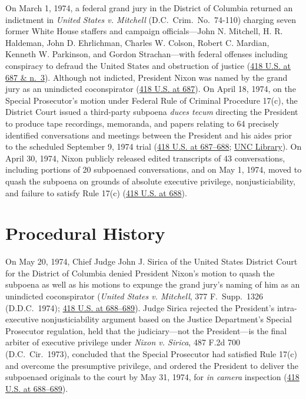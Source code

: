 \documentclass[12pt]{article}
\begin{document}
On March 1, 1974, a federal grand jury in the District of Columbia returned an indictment in \textit{United States v. Mitchell} (D.C.\ Crim.\ No.\ 74-110) charging seven former White House staffers and campaign officials---John N. Mitchell, H. R. Haldeman, John D. Ehrlichman, Charles W. Colson, Robert C. Mardian, Kenneth W. Parkinson, and Gordon Strachan---with federal offenses including conspiracy to defraud the United States and obstruction of justice (\href{https://supreme.justia.com/cases/federal/us/418/683/}{418 U.S. at 687 \& n.\ 3}). Although not indicted, President Nixon was named by the grand jury as an unindicted coconspirator (\href{https://supreme.justia.com/cases/federal/us/418/683/}{418 U.S. at 687}). On April 18, 1974, on the Special Prosecutor's motion under Federal Rule of Criminal Procedure 17(c), the District Court issued a third-party subpoena \textit{duces tecum} directing the President to produce tape recordings, memoranda, and papers relating to 64 precisely identified conversations and meetings between the President and his aides prior to the scheduled September 9, 1974 trial (\href{https://supreme.justia.com/cases/federal/us/418/683/}{418 U.S. at 687--688}; \href{https://exhibits.lib.unc.edu/exhibits/show/watergate/timeline}{UNC Library}). On April 30, 1974, Nixon publicly released edited transcripts of 43 conversations, including portions of 20 subpoenaed conversations, and on May 1, 1974, moved to quash the subpoena on grounds of absolute executive privilege, nonjusticiability, and failure to satisfy Rule 17(c) (\href{https://supreme.justia.com/cases/federal/us/418/683/}{418 U.S. at 688}).

\section{Procedural History}

On May 20, 1974, Chief Judge John J. Sirica of the United States District Court for the District of Columbia denied President Nixon's motion to quash the subpoena as well as his motions to expunge the grand jury's naming of him as an unindicted coconspirator (\textit{United States v. Mitchell}, 377 F.\ Supp.\ 1326 (D.D.C.\ 1974); \href{https://supreme.justia.com/cases/federal/us/418/683/}{418 U.S. at 688--689}). Judge Sirica rejected the President's intra-executive nonjusticiability argument based on the Justice Department's Special Prosecutor regulation, held that the judiciary---not the President---is the final arbiter of executive privilege under \textit{Nixon v. Sirica}, 487 F.2d 700 (D.C.\ Cir.\ 1973), concluded that the Special Prosecutor had satisfied Rule 17(c) and overcome the presumptive privilege, and ordered the President to deliver the subpoenaed originals to the court by May 31, 1974, for \textit{in camera} inspection (\href{https://supreme.justia.com/cases/federal/us/418/683/}{418 U.S. at 688--689}).
\end{document}
